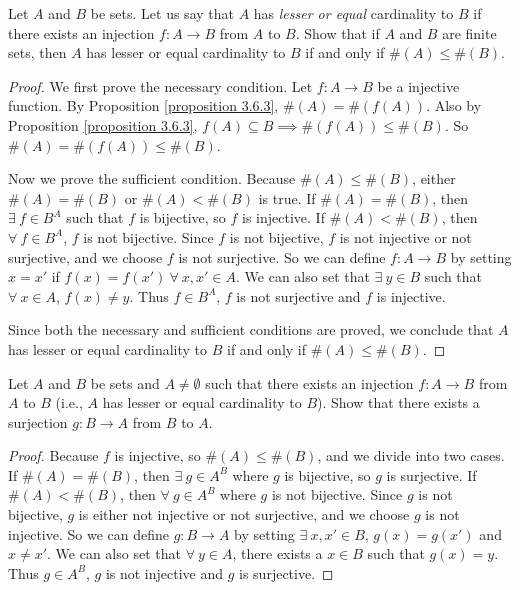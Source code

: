 \begin{exercise}\label{exercise 3.6.5}
Let \(A\) and \(B\) be sets.
Let us say that \(A\) has \emph{lesser or equal} cardinality to \(B\) if there exists an injection \(f : A \to B\) from \(A\) to \(B\).
Show that if \(A\) and \(B\) are finite sets, then \(A\) has lesser or equal cardinality to \(B\) if and only if \(\#(A) \leq \#(B)\).
\end{exercise}

\begin{proof}
We first prove the necessary condition.
Let \(f : A \to B\) be a injective function.
By Proposition \ref{proposition 3.6.3}, \(\#(A) = \#(f(A))\).
Also by Proposition \ref{proposition 3.6.3}, \(f(A) \subseteq B \implies \#(f(A)) \leq \#(B)\).
So \(\#(A) = \#(f(A)) \leq \#(B)\).

Now we prove the sufficient condition.
Because \(\#(A) \leq \#(B)\), either \(\#(A) = \#(B)\) or \(\#(A) < \#(B)\) is true.
If \(\#(A) = \#(B)\), then \(\exists\ f \in B^A\) such that \(f\) is bijective, so \(f\) is injective.
If \(\#(A) < \#(B)\), then \(\forall\ f \in B^A\), \(f\) is not bijective.
Since \(f\) is not bijective, \(f\) is not injective or not surjective, and we choose \(f\) is not surjective.
So we can define  \(f : A \to B\) by setting \(x = x'\) if \(f(x) = f(x') \ \forall\ x, x' \in A\).
We can also set that \(\exists\ y \in B\) such that \(\forall\ x \in A\), \(f(x) \neq y\).
Thus \(f \in B^A\), \(f\) is not surjective and \(f\) is injective.

Since both the necessary and sufficient conditions are proved, we conclude that \(A\) has lesser or equal cardinality to \(B\) if and only if \(\#(A) \leq \#(B)\).
\end{proof}

\begin{exercise}\label{exercise 3.6.6}
Let \(A\) and \(B\) be sets and \(A \neq \emptyset\) such that there exists an injection \(f : A \to B\) from \(A\) to \(B\) (i.e., \(A\) has lesser or equal cardinality to \(B\)).
Show that there exists a surjection \(g : B \to A\) from \(B\) to \(A\).
\end{exercise}

\begin{proof}
Because \(f\) is injective, so \(\#(A) \leq \#(B)\), and we divide into two cases.
If \(\#(A) = \#(B)\), then \(\exists\ g \in A^B\) where \(g\) is bijective, so \(g\) is surjective.
If \(\#(A) < \#(B)\), then \(\forall\ g \in A^B\) where \(g\) is not bijective.
Since \(g\) is not bijective, \(g\) is either not injective or not surjective, and we choose \(g\) is not injective.
So we can define \(g : B \to A\) by setting \(\exists\ x, x' \in B\), \(g(x) = g(x')\) and \(x \neq x'\).
We can also set that \(\forall\ y \in A\), there exists a \(x \in B\) such that \(g(x) = y\).
Thus \(g \in A^B\), \(g\) is not injective and \(g\) is surjective.
\end{proof}

